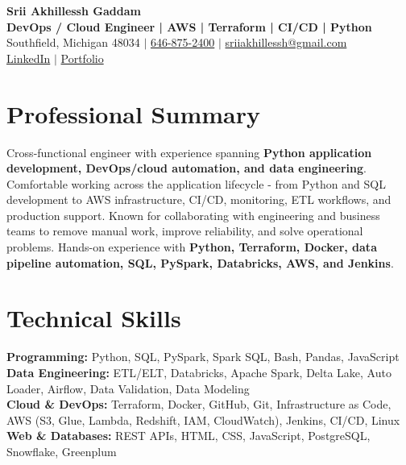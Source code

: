 \documentclass[letterpaper,10pt]{article}
\begin{document}
\fontsize{9.35pt}{10.45pt}\selectfont

\begin{center}
    {\LARGE \textbf{Srii Akhillessh Gaddam}} \\[-1pt]
    \textbf{DevOps / Cloud Engineer | AWS | Terraform | CI/CD | Python} \\[2pt]
    Southfield, Michigan 48034 $|$
    \href{tel:6468752400}{646-875-2400} $|$
    \href{mailto:sriiakhillessh@gmail.com}{sriiakhillessh@gmail.com} \\[1pt]
    \href{https://www.linkedin.com/in/srii-akhiilessh-gaddam-b48668191/}{LinkedIn} $|$
    \href{https://sriiakhillesshg.github.io/portfolio/}{Portfolio}
\end{center}
\vspace{-8pt}

\section{Professional Summary}
\small{Cross-functional engineer with experience spanning \textbf{Python application development, DevOps/cloud automation, and data engineering}. Comfortable working across the application lifecycle - from Python and SQL development to AWS infrastructure, CI/CD, monitoring, ETL workflows, and production support. Known for collaborating with engineering and business teams to remove manual work, improve reliability, and solve operational problems. Hands-on experience with \textbf{Python, Terraform, Docker, data pipeline automation, SQL, PySpark, Databricks, AWS, and Jenkins}.}

\section{Technical Skills}
\small{
\textbf{Programming:} Python, SQL, PySpark, Spark SQL, Bash, Pandas, JavaScript \\
\textbf{Data Engineering:} ETL/ELT, Databricks, Apache Spark, Delta Lake, Auto Loader, Airflow, Data Validation, Data Modeling \\
\textbf{Cloud \& DevOps:} Terraform, Docker, GitHub, Git, Infrastructure as Code, AWS (S3, Glue, Lambda, Redshift, IAM, CloudWatch), Jenkins, CI/CD, Linux \\
\textbf{Web \& Databases:} REST APIs, HTML, CSS, JavaScript, PostgreSQL, Snowflake, Greenplum
}
\end{document}
